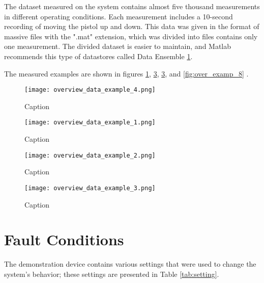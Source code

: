 The dataset measured on the system contains almost five thousand
measurements in different operating conditions. Each measurement includes a
10-second recording of moving the pistol up and down. This data was given
in the format of massive files with the ".mat" extension, which was divided
into files contains only one measurement.  The divided dataset is easier to
maintain, and Matlab recommends this type of datastores called Data
Ensemble \ref{}.

The measured examples are shown in figures
\ref{fig:over_examp_1}, \ref{fig:over_examp_3}, \ref{fig:over_examp_3},
and \ref{fig:over_examp_8} .

\begin{figure}[!htb]
    \centering
    \texttt{[image: overview\_data\_example\_4.png]}
    \caption{Caption}
    \label{fig:over_examp_1}
\end{figure}


\newpage
\begin{figure}[!htb]
    \centering
    \texttt{[image: overview\_data\_example\_1.png]}
    \caption{Caption}
    \label{fig:over_examp_2}
\end{figure}

\begin{figure}[!htb]
    \centering
    \texttt{[image: overview\_data\_example\_2.png]}
    \caption{Caption}
    \label{fig:over_examp_3}
\end{figure}

\begin{figure}[!htb]
    \centering
    \texttt{[image: overview\_data\_example\_3.png]}
    \caption{Caption}
    \label{fig:over_examp_4}
\end{figure}


\section{Fault Conditions}

The demonstration device contains various settings that were used to
change the system's behavior; these settings are presented in Table
\ref{tab:setting}.

